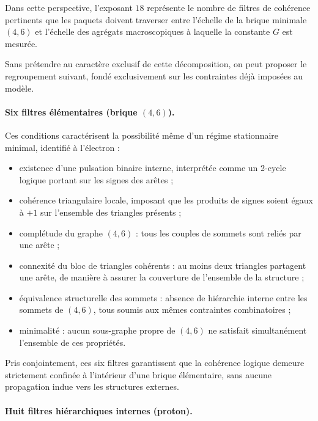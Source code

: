 \documentclass[11pt,a4paper]{article}
\begin{document}
Dans cette perspective, l’exposant \(18\) représente le nombre de filtres de cohérence pertinents que les paquets doivent traverser entre l’échelle de la brique minimale \((4,6)\) et l’échelle des agrégats macroscopiques à laquelle la constante \(G\) est mesurée.

Sans prétendre au caractère exclusif de cette décomposition, on peut proposer le regroupement suivant, fondé exclusivement sur les contraintes déjà imposées au modèle.

\paragraph{Six filtres élémentaires (brique \((4,6)\)).}

Ces conditions caractérisent la possibilité même d’un régime stationnaire minimal, identifié à l’électron :
\begin{itemize}
  \item existence d’une pulsation binaire interne, interprétée comme un 2-cycle logique portant sur les signes des arêtes ;
  \item cohérence triangulaire locale, imposant que les produits de signes soient égaux à \(+1\) sur l’ensemble des triangles présents ;
  \item complétude du graphe \((4,6)\) : tous les couples de sommets sont reliés par une arête ;
  \item connexité du bloc de triangles cohérents : au moins deux triangles partagent une arête, de manière à assurer la couverture de l’ensemble de la structure ;
  \item équivalence structurelle des sommets : absence de hiérarchie interne entre les sommets de \((4,6)\), tous soumis aux mêmes contraintes combinatoires ;
  \item minimalité : aucun sous-graphe propre de \((4,6)\) ne satisfait simultanément l’ensemble de ces propriétés.
\end{itemize}

Pris conjointement, ces six filtres garantissent que la cohérence logique demeure strictement confinée à l’intérieur d’une brique élémentaire, sans aucune propagation indue vers les structures externes.

\paragraph{Huit filtres hiérarchiques internes (proton).}
\end{document}
